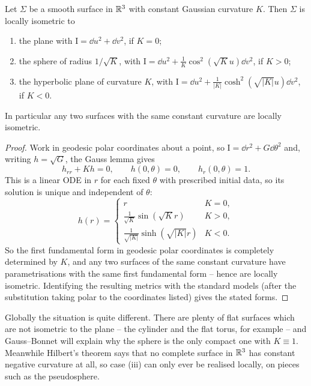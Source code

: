\documentclass[a4paper]{scrartcl}
\begin{document}
\begin{theorem}[Minding]
    Let $\Sigma$ be a smooth surface in $\mathbb{R}^3$ with constant Gaussian curvature $K$. Then $\Sigma$ is locally isometric to
    \begin{enumerate}[label=(\roman*)]
        \item the plane with $\mathrm{I} = \dd u^2 + \dd v^2$, if $K = 0$;
        \item the sphere of radius $1/\sqrt{K}$, with $\mathrm{I} = \dd u^2 + \frac{1}{K}\cos^2\left(\sqrt K u\right)\dd v^2$, if $K > 0$;
        \item the hyperbolic plane of curvature $K$, with $\mathrm{I} = \dd u^2 + \frac{1}{|K|}\cosh^2\left(\sqrt{|K|}u\right)\dd v^2$, if $K < 0$.
    \end{enumerate}
    In particular any two surfaces with the same constant curvature are locally isometric.
\end{theorem}
\begin{proof}
    Work in geodesic polar coordinates about a point, so $\mathrm{I} = \dd r^2 + G\dd\theta^2$ and, writing $h = \sqrt G$, the Gauss lemma gives
    $$
    h_{rr} + Kh = 0, \qquad h(0,\theta) = 0, \qquad h_r(0,\theta) = 1.
    $$
    This is a linear ODE in $r$ for each fixed $\theta$ with prescribed initial data, so its solution is unique and independent of $\theta$:
    $$
    h(r) = \begin{cases} r & K = 0, \\ \frac{1}{\sqrt K}\sin\left(\sqrt K r\right) & K > 0, \\ \frac{1}{\sqrt{|K|}}\sinh\left(\sqrt{|K|}r\right) & K < 0.\end{cases}
    $$
    So the first fundamental form in geodesic polar coordinates is completely determined by $K$, and any two surfaces of the same constant curvature have parametrisations with the same first fundamental form -- hence are locally isometric. Identifying the resulting metrics with the standard models (after the substitution taking polar to the coordinates listed) gives the stated forms.
\end{proof}

\begin{remark}
    Globally the situation is quite different. There are plenty of flat surfaces which are not isometric to the plane -- the cylinder and the flat torus, for example -- and Gauss--Bonnet will explain why the sphere is the only compact one with $K \equiv 1$. Meanwhile Hilbert's theorem says that no complete surface in $\mathbb{R}^3$ has constant negative curvature at all, so case (iii) can only ever be realised locally, on pieces such as the pseudosphere.
\end{remark}
\end{document}
